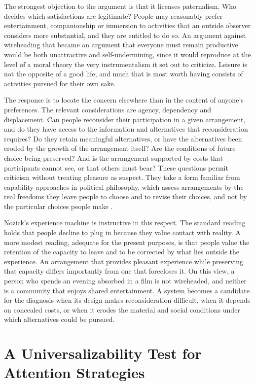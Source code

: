 \documentclass[11pt]{article}
\theoremstyle{definition}
\theoremstyle{remark}
\begin{document}
The strongest objection to the argument is that it licenses paternalism. Who decides which satisfactions are legitimate? People may reasonably prefer entertainment, companionship or immersion to activities that an outside observer considers more substantial, and they are entitled to do so. An argument against wireheading that became an argument that everyone must remain productive would be both unattractive and self-undermining, since it would reproduce at the level of a moral theory the very instrumentalism it set out to criticize. Leisure is not the opposite of a good life, and much that is most worth having consists of activities pursued for their own sake.

The response is to locate the concern elsewhere than in the content of anyone's preferences. The relevant considerations are agency, dependency and displacement. Can people reconsider their participation in a given arrangement, and do they have access to the information and alternatives that reconsideration requires? Do they retain meaningful alternatives, or have the alternatives been eroded by the growth of the arrangement itself? Are the conditions of future choice being preserved? And is the arrangement supported by costs that participants cannot see, or that others must bear? These questions permit criticism without treating pleasure as suspect. They take a form familiar from capability approaches in political philosophy, which assess arrangements by the real freedoms they leave people to choose and to revise their choices, and not by the particular choices people make \cite{sen1999}.

Nozick's experience machine is instructive in this respect. The standard reading holds that people decline to plug in because they value contact with reality. A more modest reading, adequate for the present purposes, is that people value the retention of the capacity to leave and to be corrected by what lies outside the experience. An arrangement that provides pleasant experience while preserving that capacity differs importantly from one that forecloses it. On this view, a person who spends an evening absorbed in a film is not wireheaded, and neither is a community that enjoys shared entertainment. A system becomes a candidate for the diagnosis when its design makes reconsideration difficult, when it depends on concealed costs, or when it erodes the material and social conditions under which alternatives could be pursued.

\section{A Universalizability Test for Attention Strategies}
\end{document}
